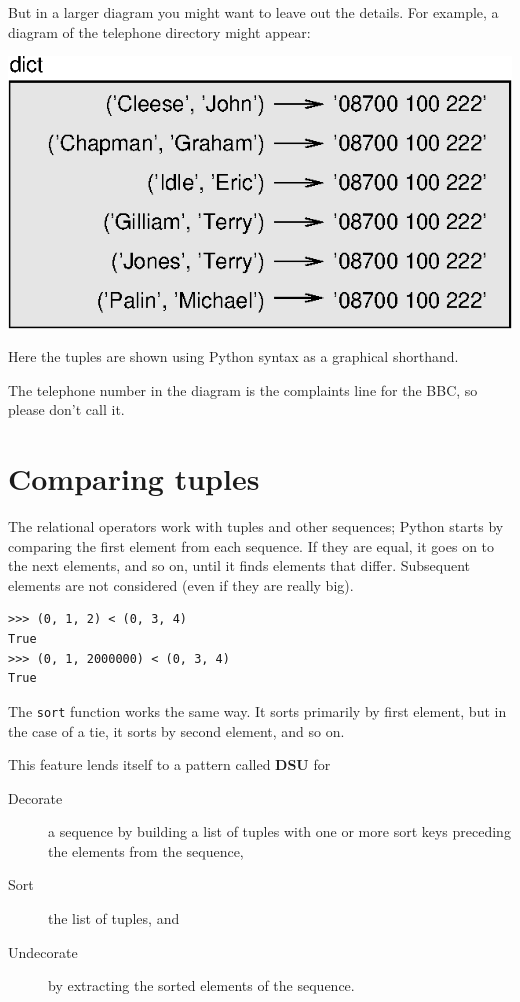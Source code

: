 \documentclass[10pt]{book}
\begin{document}
But in a larger diagram you might want to leave out the
details.  For example, a diagram of the telephone directory might
appear:

\beforefig
\centerline{\includegraphics{figs/dict2.eps}}
\afterfig

Here the tuples are shown using Python syntax as a graphical
shorthand.

The telephone number in the diagram is the complaints line for the
BBC, so please don't call it.



\section{Comparing tuples}


The relational operators work with tuples and other sequences;
Python starts by comparing the first element from each
sequence.  If they are equal, it goes on to the next elements,
and so on, until it finds elements that differ.  Subsequent
elements are not considered (even if they are really big).

\beforeverb
\begin{verbatim}
>>> (0, 1, 2) < (0, 3, 4)
True
>>> (0, 1, 2000000) < (0, 3, 4)
True
\end{verbatim}
\afterverb
%
The {\tt sort} function works the same way.  It sorts 
primarily by first element, but in the case of a tie, it sorts
by second element, and so on.  

This feature lends itself to a pattern called {\bf DSU} for 

\begin{description}

\item[Decorate] a sequence by building a list of tuples
with one or more sort keys preceding the elements from the sequence,

\item[Sort] the list of tuples, and

\item[Undecorate] by extracting the sorted elements of the sequence.

\end{description}
\end{document}
